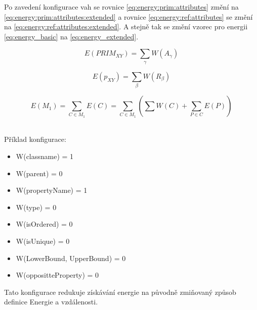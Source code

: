 \documentclass[11pt,twoside,a4paper]{book}
\begin{document}
Po zavedení konfigurace vah se rovnice \ref{eq:energy:prim:attributes} změní na
\ref{eq:energy:prim:attributes:extended} a rovnice
\eqref{eq:energy:ref:attributes} se změní na
\eqref{eq:energy:ref:attributes:extended}. A stejně tak se změní vzorec pro
energii \eqref{eq:energy_basic} na \eqref{eq:energy_extended}.

\begin{equation}E(PRIM_{XY}) =
\sum_{\gamma}W(A_\gamma) 
\label{eq:energy:prim:attributes:extended}\end{equation}

\begin{equation}E(p_{XY}) = \sum_\beta
 W(R_\beta)
 \label{eq:energy:ref:attributes:extended}\end{equation}

 \begin{equation}E(M_1) = \sum_{C \in
 M_1}E(C)= \sum_{C \in
 M_1}(\sum W(C) + \sum_{P \in C} E(P))\label{eq:energy_extended}\end{equation}

\ \\
Příklad konfigurace:
\begin{itemize}
      \item W(classname) = 1
      \item W(parent) = 0 
      \item W(propertyName) = 1
      \item W(type) = 0
      \item W(isOrdered) = 0
      \item W(isUnique) = 0
      \item W(LowerBound, UpperBound) = 0
      \item W(oppositteProperty) = 0
\end{itemize}

Tato konfigurace redukuje získávání energie na původně zmiňovaný způsob definice
Energie a vzdálenosti.
\end{document}
